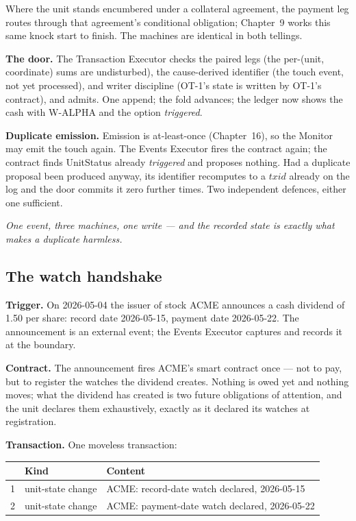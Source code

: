 Where the unit stands encumbered under a collateral agreement, the payment leg
routes through that agreement's conditional obligation; Chapter~9 works this
same knock start to finish. The machines are identical in both tellings.

\textbf{The door.} The Transaction Executor checks the paired legs (the
per-(unit, coordinate) sums are undisturbed), the cause-derived identifier (the
touch event, not yet processed), and writer discipline (OT-1's state is written
by OT-1's contract), and admits. One append; the fold advances; the ledger now
shows the cash with \mbox{W-ALPHA} and the option \emph{triggered}.

\textbf{Duplicate emission.} Emission is at-least-once (Chapter~16), so the
Monitor may emit the touch again. The Events Executor fires the contract again;
the contract finds UnitStatus already \emph{triggered} and proposes nothing.
Had a duplicate proposal been produced anyway, its identifier recomputes to a
$\mathit{txid}$ already on the log and the door commits it zero further times. Two
independent defences, either one sufficient.

\emph{One event, three machines, one write --- and the recorded state is
exactly what makes a duplicate harmless.}

\subsection{The watch handshake}

\textbf{Trigger.} On 2026-05-04 the issuer of stock ACME announces a cash
dividend of 1.50 per share: record date 2026-05-15, payment date 2026-05-22.
The announcement is an external event; the Events Executor captures and records
it at the boundary.

\textbf{Contract.} The announcement fires ACME's smart contract once --- not to
pay, but to register the watches the dividend creates. Nothing is owed yet and
nothing moves; what the dividend has created is two future obligations of
attention, and the unit declares them exhaustively, exactly as it declared its
watches at registration.

\textbf{Transaction.} One moveless transaction:

\begin{center}
\begin{tabular}{@{}rll@{}}
\toprule
 & Kind & Content \\
\midrule
1 & unit-state change & ACME: record-date watch declared, 2026-05-15 \\
2 & unit-state change & ACME: payment-date watch declared, 2026-05-22 \\
\bottomrule
\end{tabular}
\end{center}

